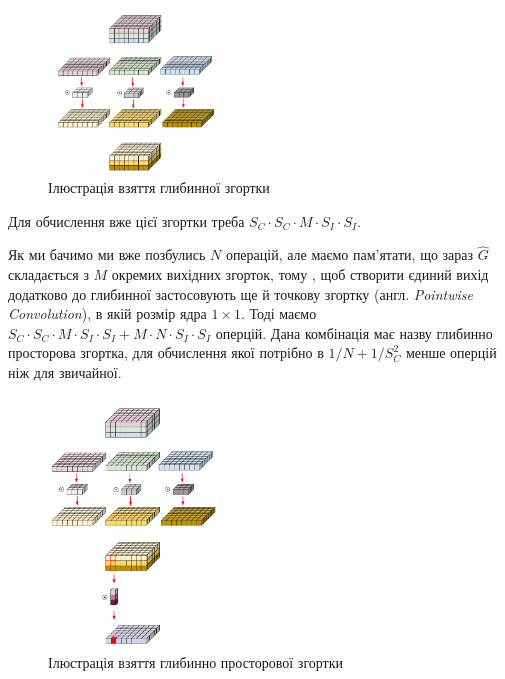 \begin{figure}[H]
    \centering
    \includegraphics[width=0.4\textwidth]{images/cnn_deep_wise_conv}
    \caption{Ілюстрація взяття глибинної згортки  \cite{deep_wise_sep_conv_website}
    \label{fig:cnn:deep_wise_conv}
    }
\end{figure}

Для обчислення вже цієї згортки треба  $S_C · S_C · M · S_I · S_I$.

Як ми бачимо ми вже позбулись $N$ операцій, але маємо пам'ятати, що
зараз $\widehat{G}$ складається з $M$ окремих вихідних згорток, тому
, щоб створити єдиний вихід додатково до глибинної застосовують ще 
й точкову згортку (англ. \textit{Pointwise Convolution}), в якій розмір
ядра $1 \times 1$. Тоді маємо 
$S_C · S_C · M · S_I · S_I + M · N · S_I · S_I$ оперцій. 
Дана комбінація має назву глибинно просторова згортка, для 
обчислення якої потрібно в $1/N + 1/S_C^2$ менше оперцій ніж
для звичайної.

\begin{figure}[H]
    \centering
    \includegraphics[width=0.4\textwidth]{images/cnn_deep_wise_separable_conv}
    \caption{Ілюстрація взяття глибинно просторової згортки  \cite{deep_wise_sep_conv_website}
    \label{fig:cnn:deep_wise_sep_conv}
    }
\end{figure}


